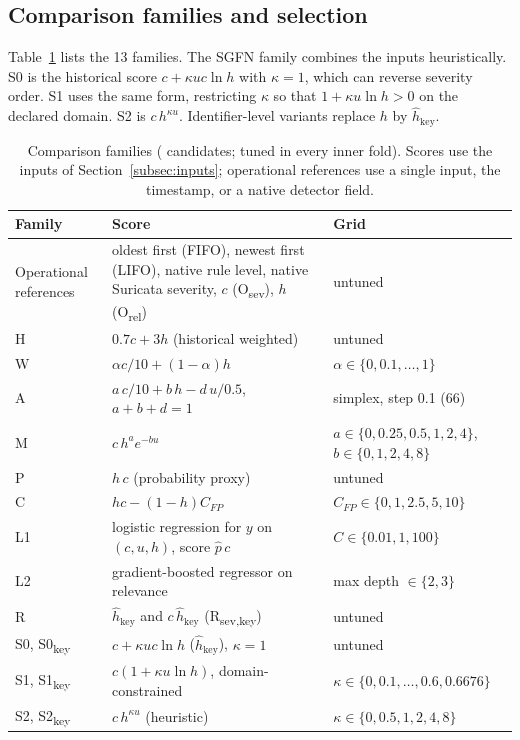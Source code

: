 \documentclass[pdflatex,sn-basic,Numbered]{sn-jnl}
\newcommand{\key}{\textsubscript{key}}
\newcommand{\Rsev}{R\textsubscript{sev,key}}
\begin{document}
\subsection{Comparison families and selection}

Table~\ref{tab:families} lists the 13 families. The SGFN family combines the inputs heuristically. S0 is the historical score $c + \kappa u c \ln h$ with $\kappa=1$, which can reverse severity order. S1 uses the same form, restricting $\kappa$ so that $1 + \kappa u \ln h > 0$ on the declared domain. S2 is $c\,h^{\kappa u}$. Identifier-level variants replace $h$ by $\hat h_{\mathrm{key}}$.

\begin{table}[t]
\caption{Comparison families (\NCandidates{} candidates; \NTuned{} tuned in every inner fold). Scores use the inputs of Section~\ref{subsec:inputs}; operational references use a single input, the timestamp, or a native detector field.}
\label{tab:families}
\small
\setlength{\tabcolsep}{4pt}
\begin{tabular}{>{\raggedright\arraybackslash}p{}>{\raggedright\arraybackslash}p{}>{\raggedright\arraybackslash}p{}}
\toprule
Family & Score & Grid \\
\midrule
Operational references & oldest first (FIFO), newest first (LIFO), native rule level, native Suricata severity, $c$ (O\textsubscript{sev}), $h$ (O\textsubscript{rel}) & untuned \\
H & $0.7c + 3h$ (historical weighted) & untuned \\
W & $\alpha c/10 + (1-\alpha) h$ & $\alpha \in \{0, 0.1, \dots, 1\}$ \\
A & $a\,c/10 + b\,h - d\,u/0.5$, $a+b+d=1$ & simplex, step 0.1 (66) \\
M & $c\,h^{a} e^{-bu}$ & $a \in \{0,0.25,0.5,1,2,4\}$, $b \in \{0,1,2,4,8\}$ \\
P & $h\,c$ (probability proxy) & untuned \\
C & $h c - (1-h) C_{FP}$ & $C_{FP} \in \{0,1,2.5,5,10\}$ \\
L1 & logistic regression for $y$ on $(c,u,h)$, score $\hat p\,c$ & $C \in \{0.01, 1, 100\}$ \\
L2 & gradient-boosted regressor on relevance & max depth $\in \{2,3\}$ \\
R & $\hat h_{\mathrm{key}}$ and $c\,\hat h_{\mathrm{key}}$ (\Rsev) & untuned \\
S0, S0\key & $c + \kappa u c \ln h$ ($\hat h_{\mathrm{key}}$), $\kappa = 1$ & untuned \\
S1, S1\key & $c(1 + \kappa u \ln h)$, domain-constrained & $\kappa \in \{0,0.1,\dots,0.6,0.6676\}$ \\
S2, S2\key & $c\,h^{\kappa u}$ (heuristic) & $\kappa \in \{0,0.5,1,2,4,8\}$ \\
\bottomrule
\end{tabular}
\end{table}
\end{document}
